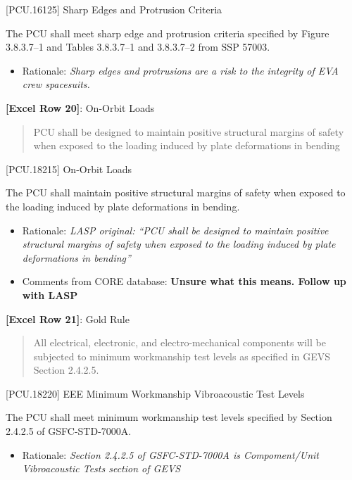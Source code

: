 [PCU.16125] Sharp Edges and Protrusion Criteria

The PCU shall meet sharp edge and protrusion criteria specified by Figure 3.8.3.7--1 and Tables 3.8.3.7--1 and 3.8.3.7--2 from SSP 57003.

\begin{itemize}
\item{} Rationale: \emph{Sharp edges and protrusions are a risk to the integrity of EVA crew spacesuits.}

\end{itemize}

\textbf{[Excel Row 20]}: On-Orbit Loads

\begin{quote}
PCU shall be designed to maintain positive structural margins of safety when exposed to the loading induced by plate deformations in bending
\end{quote}

[PCU.18215] On-Orbit Loads

The PCU shall maintain positive structural margins of safety when exposed to the loading induced by plate deformations in bending.

\begin{itemize}
\item{} Rationale: \emph{LASP original: ``PCU shall be designed to maintain positive structural margins of safety when exposed to the loading induced by plate deformations in bending''}

\item{} Comments from CORE database: \textbf{\textbf{Unsure what this means. Follow up with LASP}}

\end{itemize}

\textbf{[Excel Row 21]}: Gold Rule

\begin{quote}
All electrical, electronic, and electro-mechanical components will be subjected to minimum workmanship test levels as specified in GEVS Section 2.4.2.5.
\end{quote}

[PCU.18220] EEE Minimum Workmanship Vibroacoustic Test Levels

The PCU shall meet minimum workmanship test levels specified by Section 2.4.2.5 of GSFC-STD-7000A.

\begin{itemize}
\item{} Rationale: \emph{Section 2.4.2.5 of GSFC-STD-7000A is Compoment\slash Unit Vibroacoustic Tests section of GEVS}

\end{itemize}

